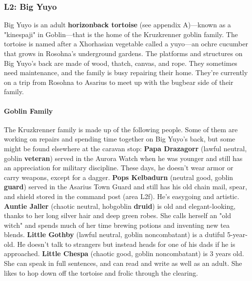 \documentclass[10pt,a4,twoside,twocolumn,openany,nodeprecatedcode]{dndbook}
\begin{document}
\subsubsection{L2: Big Yuyo}
Big Yuyo is an adult \textbf{horizonback tortoise} (see appendix A)—known as a "kinespaji" in Goblin—that is the home of the Kruzkrenner goblin family. The tortoise is named after a Xhorhasian vegetable called a yuyo—an ochre cucumber that grows in Rosohna's underground gardens.
The platforms and structures on Big Yuyo's back are made of wood, thatch, canvas, and rope. They sometimes need maintenance, and the family is busy repairing their home. They're currently on a trip from Rosohna to Asarius to meet up with the bugbear side of their family.
\paragraph{Goblin Family}
The Kruzkrenner family is made up of the following people. Some of them are working on repairs and spending time together on Big Yuyo's back, but some might be found elsewhere at the caravan stop:
\textbf{Papa Drazagorr} (lawful neutral, goblin \textbf{veteran}) served in the Aurora Watch when he was younger and still has an appreciation for military discipline. These days, he doesn't wear armor or carry weapons, except for a dagger.
\textbf{Pops Kelbadurn} (neutral good, goblin \textbf{guard}) served in the Asarius Town Guard and still has his old chain mail, spear, and shield stored in the command post (area L2f). He's easygoing and artistic.
\textbf{Auntie Jaller} (chaotic neutral, hobgoblin \textbf{druid}) is old and elegant-looking, thanks to her long silver hair and deep green robes. She calls herself an "old witch" and spends much of her time brewing potions and inventing new tea blends.
\textbf{Little Gothby} (lawful neutral, goblin noncombatant) is a dutiful 5-year-old. He doesn't talk to strangers but instead heads for one of his dads if he is approached.
\textbf{Little Chespa} (chaotic good, goblin noncombatant) is 3 years old. She can speak in full sentences, and can read and write as well as an adult. She likes to hop down off the tortoise and frolic through the clearing.
\end{document}
